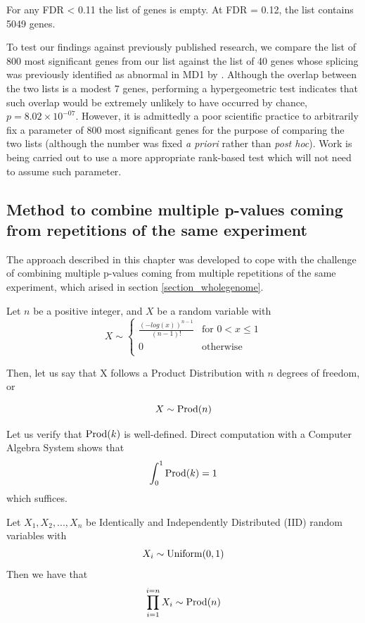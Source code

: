 For any FDR < 0.11 the list of genes is empty. At FDR = 0.12, the list contains 5049 genes.

To test our findings against previously published research, we compare the list of 800 most significant genes from our list against the list of 40 genes whose splicing was previously identified as abnormal in MD1 by \cite{Nakamori2013}. Although the overlap between the two lists is a modest 7 genes, performing a hypergeometric test indicates that such overlap would be extremely unlikely to have occurred by chance, $p = 8.02 × 10^{-07}$. However, it is admittedly a poor scientific practice to arbitrarily fix a parameter of 800 most significant genes for the purpose of comparing the two lists (although the number was fixed \textit{a priori} rather than \textit{post hoc}). Work is being carried out to use a more appropriate rank-based test which will not need to assume such parameter.

\subsection{Method to combine multiple p-values coming from repetitions of the same experiment} \label{pvalues}

The approach described in this chapter was developed to cope with the challenge of combining multiple p-values coming from multiple repetitions of the same experiment, which arised in section \ref{section_wholegenome}.

\begin{definition}

Let $n$ be a positive integer, and $X$ be a random variable with
$$
X \sim
\begin{cases}
  \frac{(-log(x))^{n-1}}{(n-1)!} & \text{for } 0 < x \leq 1 \\
  0 & \text{otherwise } \\
\end{cases}
$$

Then, let us say that X follows a Product Distribution with $n$ degrees of freedom, or

$$X \sim \operatorname{Prod}(n)$$

\end{definition}

Let us verify that $\operatorname{Prod}(k)$ is well-defined. Direct computation with a Computer Algebra System shows that $$\int_{0}^{1}\operatorname{Prod}(k)=1$$ which suffices.

\begin{lemma}

\label{lemmaProdUniform}

Let $X_{1}, X_{2}, ..., X_{n}$ be Identically and Independently Distributed (IID) random variables with $$X_{i} \sim \operatorname{Uniform}(0, 1)$$ Then we have that $$\prod_{i=1}^{i=n} X_{i} \sim \operatorname{Prod}(n)$$

\end{lemma}

